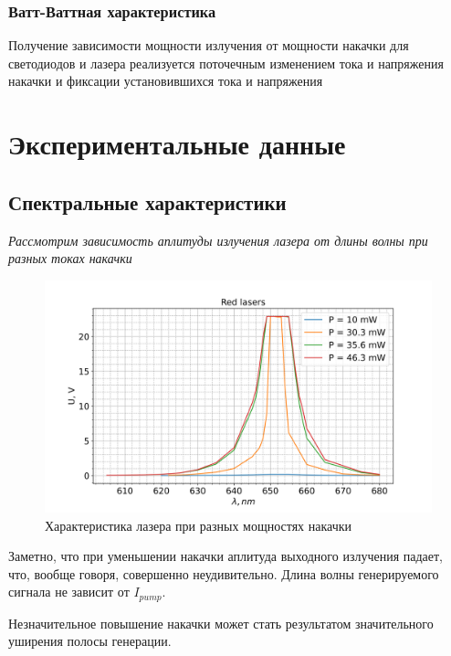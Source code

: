 \documentclass[a4paper]{article}
\begin{document}
        \subsubsection{Ватт-Ваттная характеристика}
        
            \par Получение зависимости мощности излучения от мощности накачки для светодиодов и лазера реализуется поточечным изменением тока и напряжения накачки и фиксации установившихся тока и напряжения
    
\section{Экспериментальные данные}
    \subsection{Спектральные характеристики}
    
        \par \textit{Рассмотрим зависимость аплитуды излучения лазера от длины волны при разных токах накачки}
        
        \begin{figure}[H]
            \begin{center}
                \includegraphics[scale=0.5]{spectr_red_lasers.png}
                \caption{Характеристика лазера при разных мощностях накачки}
                \label{lasers}
            \end{center}
        \end{figure}
        
        \par Заметно, что при уменьшении накачки аплитуда выходного излучения падает, что, вообще говоря, совершенно неудивительно. Длина волны генерируемого сигнала не зависит от {$I_{pump}$}.
        \par Незначительное повышение накачки может стать результатом значительного уширения полосы генерации.
        
\end{document}

